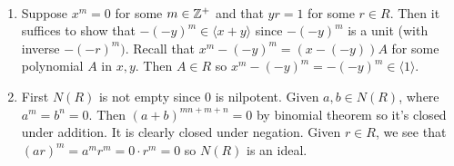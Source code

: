 \documentclass[12pt]{article}
\begin{document}
\begin{problem}[2]
~\begin{enumerate}[label=(\alph*)]
	\item Suppose $ x^{m} = 0$ for some $ m \in \mathbb{Z}^{+}$ and that $ yr =1$ for some $ r \in R$. Then it suffices to show that $ -(-y)^{m} \in \langle x+y \rangle$ since $ -(-y)^{m}$ is a unit (with inverse $ -(-r)^{m})$. Recall that $ x^{m} - (-y)^{m} = (x-(-y))A$ for some polynomial $ A$ in $ x,y$. Then $ A \in R$ so $ x^{m} - (-y)^{m} = -(-y)^{m} \in \langle 1 \rangle$.
\item First $ N(R)$ is not empty since $0 $ is nilpotent. Given $ a,b \in N(R)$, where $ a^{m} = b^{n} = 0$. Then $ (a+b)^{mn+m+n} = 0$ by binomial theorem so it's closed under addition. It is clearly closed under negation. Given $ r \in R$, we see that $ (ar)^{m} = a^{m} r^{m} = 0 \cdot r^{m}=0$ so $ N(R)$ is an ideal.


\end{enumerate}
\end{problem}
\end{document}
